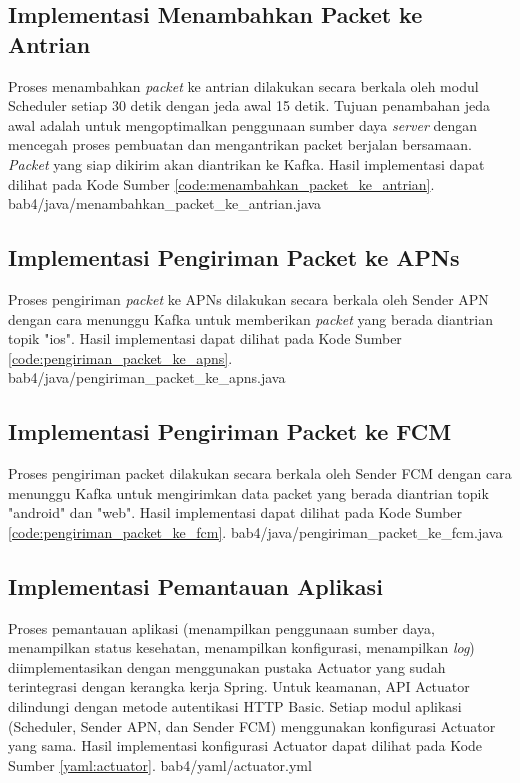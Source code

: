 \subsection{Implementasi Menambahkan Packet ke Antrian}
\par Proses menambahkan \textit{packet} ke antrian dilakukan secara berkala oleh modul Scheduler setiap 30 detik dengan jeda awal 15 detik. Tujuan penambahan jeda awal adalah untuk mengoptimalkan penggunaan sumber daya \textit{server} dengan mencegah proses pembuatan dan mengantrikan packet berjalan bersamaan. \textit{Packet} yang siap dikirim akan diantrikan ke Kafka. Hasil implementasi dapat dilihat pada Kode Sumber \ref{code:menambahkan_packet_ke_antrian}.
 {bab4/java/menambahkan_packet_ke_antrian.java}

\subsection{Implementasi Pengiriman Packet ke APNs}
\par Proses pengiriman \textit{packet} ke APNs dilakukan secara berkala oleh Sender APN dengan cara menunggu Kafka untuk memberikan \textit{packet} yang berada diantrian topik "ios". Hasil implementasi dapat dilihat pada Kode Sumber \ref{code:pengiriman_packet_ke_apns}.
 {bab4/java/pengiriman_packet_ke_apns.java}

\subsection{Implementasi Pengiriman Packet ke FCM}
\par Proses pengiriman packet dilakukan secara berkala oleh Sender FCM dengan cara menunggu Kafka untuk mengirimkan data packet yang berada diantrian topik "android" dan "web". Hasil implementasi dapat dilihat pada Kode Sumber \ref{code:pengiriman_packet_ke_fcm}.
 {bab4/java/pengiriman_packet_ke_fcm.java}

\subsection{Implementasi Pemantauan Aplikasi}
\par Proses pemantauan aplikasi (menampilkan penggunaan sumber daya, menampilkan status kesehatan, menampilkan konfigurasi, menampilkan \textit{log}) diimplementasikan dengan menggunakan pustaka Actuator yang sudah terintegrasi dengan kerangka kerja Spring. Untuk keamanan, API Actuator dilindungi dengan metode autentikasi HTTP Basic. Setiap modul aplikasi (Scheduler, Sender APN, dan Sender FCM) menggunakan konfigurasi Actuator yang sama. Hasil implementasi konfigurasi Actuator dapat dilihat pada Kode Sumber \ref{yaml:actuator}.
\clearpage
 {bab4/yaml/actuator.yml}
